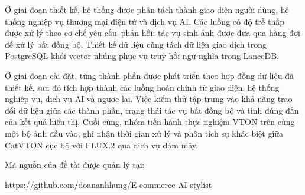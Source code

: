 Ở giai đoạn thiết kế, hệ thống được phân tách thành giao diện người dùng, hệ thống nghiệp vụ thương mại điện tử và dịch vụ AI. Các luồng có độ trễ thấp được xử lý theo cơ chế yêu cầu--phản hồi; tác vụ sinh ảnh được đưa qua hàng đợi để xử lý bất đồng bộ. Thiết kế dữ liệu cũng tách dữ liệu giao dịch trong PostgreSQL khỏi vector nhúng phục vụ truy hồi ngữ nghĩa trong LanceDB.

\medskip

Ở giai đoạn cài đặt, từng thành phần được phát triển theo hợp đồng dữ liệu đã thiết kế, sau đó tích hợp thành các luồng hoàn chỉnh từ giao diện, hệ thống nghiệp vụ, dịch vụ AI và ngược lại. Việc kiểm thử tập trung vào khả năng trao đổi dữ liệu giữa các thành phần, trạng thái tác vụ bất đồng bộ và tính đúng đắn của kết quả hiển thị. Cuối cùng, nhóm tiến hành thực nghiệm VTON trên cùng một bộ ảnh đầu vào, ghi nhận thời gian xử lý và phân tích sự khác biệt giữa CatVTON cục bộ với FLUX.2 qua dịch vụ đám mây.

\medskip

Mã nguồn của đề tài được quản lý tại:
\begin{center}
\url{https://github.com/doananhhung/E-commerce-AI-stylist}
\end{center}

\clearpage
